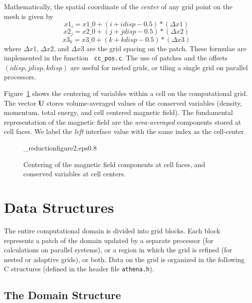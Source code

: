 Mathematically, the spatial coordinate of the {\em center} of any grid point
on the mesh is given by
\begin{displaymath}
  x1_{i} = x1\_0 + (i + idisp - 0.5)*(\Delta x1)
\end{displaymath}
\begin{displaymath}
  x2_{j} = x2\_0 + (j + jdisp - 0.5)*(\Delta x2)
\end{displaymath}
\begin{displaymath}
  x3_{k} = x3\_0 + (k + kdisp - 0.5)*(\Delta x3)
\end{displaymath}
where $\Delta x1$, $\Delta x2$, and $\Delta x3$ are the grid spacing
on the patch.  These formulae are implemented in the function {\tt
cc\_pos.c}.  The use of patches and the offsets $(idisp, jdisp, kdisp)$ are
useful for nested grids, or tiling a single grid on parallel processors.

Figure~\ref{f:gridcell} shows the centering of variables within a cell
on the computational grid.  The vector {\bf U} stores volume-averaged
values of the conserved variables (density, momentum, total energy, and
cell centered magnetic field).  The fundamental representation of the
magnetic field are the {\em area-averaged} components stored at cell faces. 
We label the {\em left} interface value with the same index as the cell-center.

\begin{figure}[htb!]
\plotone_reduction{figure2.eps}{0.8}
\caption{Centering of the magnetic field components at cell faces, and
conserved variables at cell centers.}
\label{f:gridcell}
\end{figure}


\section{Data Structures}

The entire computational domain is divided into grid blocks.  Each block
represents a patch of the domain updated by a separate processor (for
calculations on parallel systems), or
a region in which the grid is refined (for nested or adaptive grids), or
both.  Data on the grid is organized in the following C structures (defined in 
the header file {\tt athena.h}).

\subsection{The Domain Structure}

